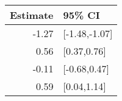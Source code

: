 \begin{tabular}{rl}
  \hline
Estimate & 95\% CI \\ 
  \hline
-1.27 & [-1.48,-1.07] \\ 
  0.56 & [0.37,0.76] \\ 
  -0.11 & [-0.68,0.47] \\ 
  0.59 & [0.04,1.14] \\ 
   \hline
\end{tabular}

